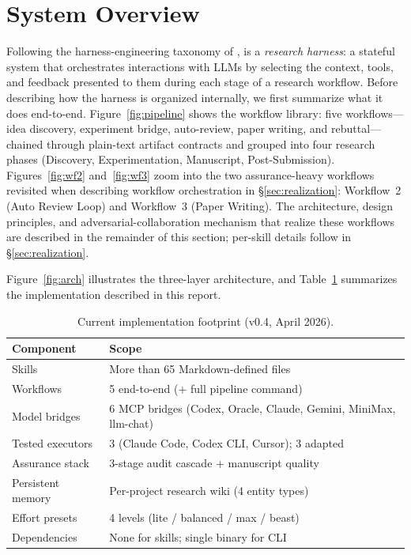\section{System Overview}
\label{sec:overview}

Following the harness-engineering taxonomy of \citet{lee2026metaharness}, \aris{} is a \emph{research harness}: a stateful system that orchestrates interactions with LLMs by selecting the context, tools, and feedback presented to them during each stage of a research workflow.
Before describing how the harness is organized internally, we first summarize what it does end-to-end.
Figure~\ref{fig:pipeline} shows the workflow library: five workflows---idea discovery, experiment bridge, auto-review, paper writing, and rebuttal---chained through plain-text artifact contracts and grouped into four research phases (Discovery, Experimentation, Manuscript, Post-Submission).
Figures~\ref{fig:wf2} and~\ref{fig:wf3} zoom into the two assurance-heavy workflows revisited when describing workflow orchestration in \S\ref{sec:realization}: Workflow~2 (Auto Review Loop) and Workflow~3 (Paper Writing).
The architecture, design principles, and adversarial-collaboration mechanism that realize these workflows are described in the remainder of this section; per-skill details follow in \S\ref{sec:realization}.







Figure~\ref{fig:arch} illustrates the three-layer architecture, and Table~\ref{tab:snapshot} summarizes the implementation described in this report.



\begin{table}[t]
\centering
\caption{Current \aris{} implementation footprint (v0.4, April 2026).}
\label{tab:snapshot}
\small
\begin{tabular}{@{}ll@{}}
\toprule
\textbf{Component} & \textbf{Scope} \\
\midrule
Skills & More than 65 Markdown-defined files \\
Workflows & 5 end-to-end (+ full pipeline command) \\
Model bridges & 6 MCP bridges (Codex, Oracle, Claude, Gemini, MiniMax, llm-chat) \\
Tested executors & 3 (Claude Code, Codex CLI, Cursor); 3 adapted \\
Assurance stack & 3-stage audit cascade + manuscript quality \\
Persistent memory & Per-project research wiki (4 entity types) \\
Effort presets & 4 levels (lite / balanced / max / beast) \\
Dependencies & None for skills; single binary for CLI \\
\bottomrule
\end{tabular}
\end{table}

